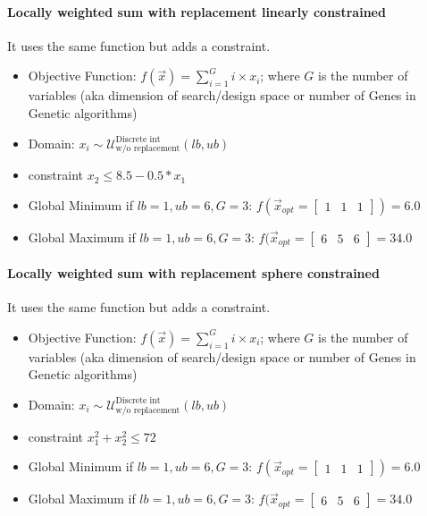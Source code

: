 \paragraph{Locally weighted sum with replacement linearly constrained}
It uses the same function but adds a constraint.
\begin{itemize}
	\item Objective Function: $f(\vec{x}) = \sum_{i=1}^{G}i \times x_i$; where $G$ is the number of variables (aka dimension of search/design space or number of Genes in Genetic algorithms) 
	\item Domain: $x_i \sim \mathcal{U}^{\text{Discrete int}}_{\text{w/o replacement}} (lb,ub)$
	\item constraint $x_2 \leq 8.5 - 0.5 * x_1$
	\item Global Minimum if $lb = 1, ub = 6, G =3$: $f(\vec{x}_{opt} = \begin{bmatrix}
	1 & 1 & 1 \end{bmatrix}) = 6.0$
	\item Global Maximum if $lb = 1, ub = 6, G =3$: $f(\vec{x}_{opt} = \begin{bmatrix}
	6 & 5 & 6 \end{bmatrix} = 34.0$
\end{itemize}

\paragraph{Locally weighted sum with replacement sphere constrained}
It uses the same function but adds a constraint.
\begin{itemize}
	\item Objective Function: $f(\vec{x}) = \sum_{i=1}^{G}i \times x_i$; where $G$ is the number of variables (aka dimension of search/design space or number of Genes in Genetic algorithms) 
	\item Domain: $x_i \sim \mathcal{U}^{\text{Discrete int}}_{\text{w/o replacement}} (lb,ub)$
	\item constraint $x^{2}_{1} + x^{2}_{2} \leq 72$
	\item Global Minimum if $lb = 1, ub = 6, G =3$: $f(\vec{x}_{opt} = \begin{bmatrix}
1 & 1 & 1 \end{bmatrix})= 6.0$
\item Global Maximum if $lb = 1, ub = 6, G =3$: $f(\vec{x}_{opt} = \begin{bmatrix}
6 & 5 & 6 \end{bmatrix} = 34.0$
\end{itemize}
